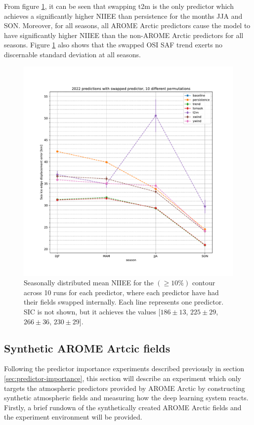 \documentclass[../main/thesis.tex]{subfiles}
\begin{document}
From figure \ref{fig:swapped}, it can be seen that swapping t2m is the only predictor which achieves a significantly higher NIIEE than persistence for the months JJA and SON. Moreover, for all seasons, all AROME Arctic predictors cause the model to have significantly higher NIIEE than the non-AROME Arctic predictors for all seasons. Figure \ref{fig:swapped} also shows that the swapped OSI SAF trend exerts no discernable standard deviation at all seasons.


\begin{figure}
    \centering
    \includegraphics[width=\textwidth]{swapped.pdf}
    \caption{\label{fig:swapped}Seasonally distributed mean NIIEE for the $(\geq10\%)$ contour across 10 runs for each predictor, where each predictor have had their fields swapped internally. Each line represents one predictor. SIC is not shown, but it achieves the values [$186 \pm 13$, $225 \pm 29$, $266 \pm 36$, $230 \pm 29$].}
\end{figure}

\subsection{Synthetic AROME Artcic fields}
\label{sec:synthetic_preds}
Following the predictor importance experiments described previously in section \ref{sec:predictor-importance}, this section will describe an experiment which only targets the atmospheric predictors provided by AROME Arctic by constructing synthetic atmospheric fields and measuring how the deep learning system reacts. Firstly, a brief rundown of the synthetically created AROME Arctic fields and the experiment environment will be provided.
\end{document}
